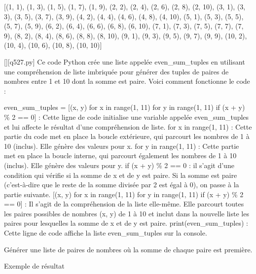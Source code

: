 [(1, 1), (1, 3), (1, 5), (1, 7), (1, 9), (2, 2), (2, 4), (2, 6), (2, 8), (2, 10), (3, 1), (3, 3), (3, 5), (3, 7), (3, 9), (4, 2), (4, 4), (4, 6), (4, 8), (4, 10), (5, 1), (5, 3), (5, 5), (5, 7), (5, 9), (6, 2), (6, 4), (6, 6), (6, 8), (6, 10), (7, 1), (7, 3), (7, 5), (7, 7), (7, 9), (8, 2), (8, 4), (8, 6), (8, 8), (8, 10), (9, 1), (9, 3), (9, 5), (9, 7), (9, 9), (10, 2), (10, 4), (10, 6), (10, 8), (10, 10)]
        \par
        \begin{solution}
            \renewcommand{\nomfichier}{q527.py}
            \pythonfile{\chemincode \nomfichier}[][\nomfichier]
            Ce code Python crée une liste appelée even\_sum\_tuples en utilisant une compréhension de liste imbriquée pour générer des tuples de paires de nombres entre 1 et 10 dont la somme est paire. Voici comment fonctionne le code :

    even\_sum\_tuples = [(x, y) for x in range(1, 11) for y in range(1, 11) if (x + y) \% 2 == 0] : Cette ligne de code initialise une variable appelée even\_sum\_tuples et lui affecte le résultat d'une compréhension de liste.
        for x in range(1, 11) : Cette partie du code met en place la boucle extérieure, qui parcourt les nombres de 1 à 10 (inclus). Elle génère des valeurs pour x.
        for y in range(1, 11) : Cette partie met en place la boucle interne, qui parcourt également les nombres de 1 à 10 (inclus). Elle génère des valeurs pour y.
        if (x + y) \% 2 == 0 : il s'agit d'une condition qui vérifie si la somme de x et de y est paire. Si la somme est paire (c'est-à-dire que le reste de la somme divisée par 2 est égal à 0), on passe à la partie suivante.
        [(x, y) for x in range(1, 11) for y in range(1, 11) if (x + y) \% 2 == 0] : Il s'agit de la compréhension de la liste elle-même. Elle parcourt toutes les paires possibles de nombres (x, y) de 1 à 10 et inclut dans la nouvelle liste les paires pour lesquelles la somme de x et de y est paire.
    print(even\_sum\_tuples) : Cette ligne de code affiche la liste even\_sum\_tuples sur la console.
        \end{solution}
        

        \question
        Générer une liste de paires de nombres où la somme de chaque paire est première.

Exemple de résultat

